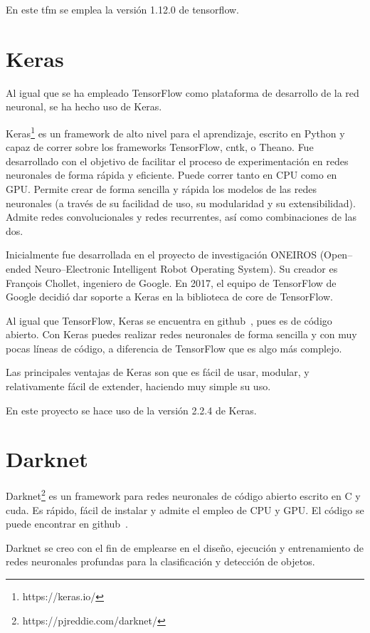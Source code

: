 En este \acrshort{tfm} se emplea la versión 1.12.0 de tensorflow.

\section{Keras}

Al igual que se ha empleado TensorFlow como plataforma de desarrollo de la red neuronal, se ha hecho uso de Keras.

Keras\footnote{https://keras.io/} es un framework de alto nivel para el aprendizaje, escrito en Python y capaz de correr sobre los frameworks TensorFlow, \acrshort{cntk}, o Theano. Fue desarrollado con el objetivo de facilitar el proceso de experimentación en redes neuronales de forma rápida y eficiente. Puede correr tanto en CPU como en GPU. Permite crear de forma sencilla y rápida los modelos de las redes neuronales (a través de su facilidad de uso, su modularidad y su extensibilidad). Admite redes convolucionales y redes recurrentes, así como combinaciones de las dos.

Inicialmente fue desarrollada en el proyecto de investigación ONEIROS (Open--ended Neuro--Electronic Intelligent Robot Operating System). Su creador es Fran\c{c}ois Chollet, ingeniero de Google.
En 2017, el equipo de TensorFlow de Google decidió dar soporte a Keras en la biblioteca de core de TensorFlow.

Al igual que TensorFlow, Keras se encuentra en github~\cite{keras_github}, pues es de código abierto. Con Keras puedes realizar redes neuronales de forma sencilla y con muy pocas líneas de código, a diferencia de TensorFlow que es algo más complejo. 

Las principales ventajas de Keras son que es fácil de usar, modular, y relativamente fácil de extender, haciendo muy simple su uso.

En este proyecto se hace uso de la versión 2.2.4 de Keras.


\section{Darknet}

Darknet\footnote{https://pjreddie.com/darknet/} es un framework para redes neuronales de código abierto escrito en C y \acrshort{cuda}. Es rápido, fácil de instalar y admite el empleo de CPU y GPU. El código se puede encontrar en github~\cite{darknet_github}.

Darknet se creo con el fin de emplearse en el diseño, ejecución y entrenamiento de redes neuronales profundas para la clasificación y detección de objetos. 


